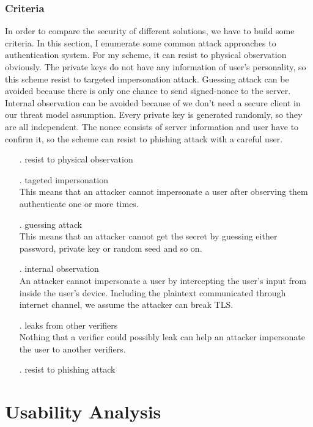 \begin{CJK}{Bg5}{bsmi}
\subsubsection{Criteria}

In order to compare the security of different solutions, we have to build some criteria. In this section, I enumerate some common attack approaches to authentication system. For my scheme, it can resist to physical observation obviously. The private keys do not have any information of user's personality, so this scheme resist to targeted impersonation attack. Guessing attack can be avoided because there is only one chance to send signed-nonce to the server. Internal observation can be avoided because of we don't need a secure client in our threat model assumption. Every private key is generated randomly, so they are all independent. The nonce consists of server information and user have to confirm it, so the scheme can resist to phishing attack with a careful user.

\begin{enumerate}
\item[.] resist to physical observation
\item[.] tageted impersonation
\\This means that an attacker cannot impersonate a user after observing them authenticate one or more times.
\item[.] guessing attack
\\This means that an attacker cannot get the secret by guessing either password, private key or random seed and so on.
\item[.] internal observation
\\An attacker cannot impersonate a user by intercepting the user's input from inside the user's device. Including the plaintext communicated through internet channel, we assume the attacker can break TLS.
\item[.] leaks from other verifiers
\\Nothing that a verifier could possibly leak can help an attacker impersonate the user to another verifiers.
\item[.] resist to phishing attack

\end{enumerate}

\section{Usability Analysis}


\end{CJK}
